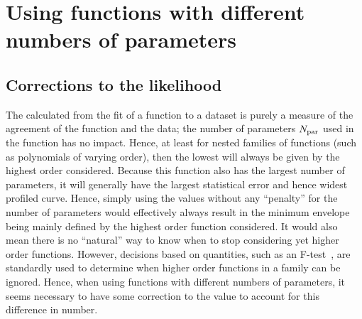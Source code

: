\section{Using functions with different numbers of parameters} %
\label{sec:correction}

\subsection{Corrections to the likelihood}
\label{sec:correction:corrections}

The \nll calculated from the fit of a function to a dataset is purely a measure
of the agreement of the function and the data; the
number of parameters $N_{\rm par}$
used in the function has no impact. Hence, at least for nested families of
functions (such as polynomials of varying order), then the lowest \nll will
always be given by the highest order considered.
Because this function also has the
largest number of parameters, it will generally have the largest statistical
error and hence widest profiled \nll curve.
Hence, simply using the \nll values
without any ``penalty'' for the number of parameters would effectively
always result in the minimum envelope being mainly defined by the highest
order function considered. It would also mean there is no ``natural'' way to know when
to stop considering yet higher order functions. However, decisions based
on quantities, such as an F-test~\cite{ref:ftest},
are standardly used to determine when higher order functions in
a family can be ignored. Hence, when using functions with different
numbers of parameters, it seems necessary to have some correction to the \nll
value to account for this difference in number.

